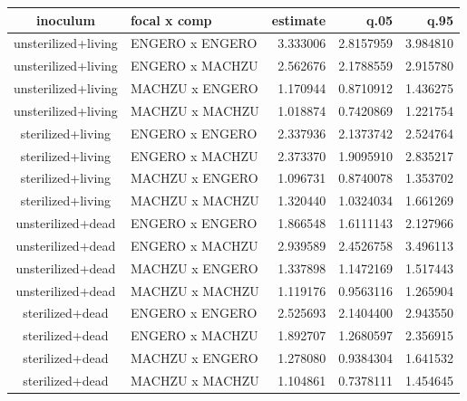 \begin{table}[t]
\fontsize{12.0pt}{14.4pt}\selectfont
\begin{tabular*}{\linewidth}{@{\extracolsep{\fill}}clrrr}
\toprule
inoculum & focal x comp & estimate & q.05 & q.95 \\ 
\midrule\addlinespace[2.5pt]
unsterilized+living & ENGERO x ENGERO & 3.333006 & 2.8157959 & 3.984810 \\ 
unsterilized+living & ENGERO x MACHZU & 2.562676 & 2.1788559 & 2.915780 \\ 
unsterilized+living & MACHZU x ENGERO & 1.170944 & 0.8710912 & 1.436275 \\ 
unsterilized+living & MACHZU x MACHZU & 1.018874 & 0.7420869 & 1.221754 \\ 
sterilized+living & ENGERO x ENGERO & 2.337936 & 2.1373742 & 2.524764 \\ 
sterilized+living & ENGERO x MACHZU & 2.373370 & 1.9095910 & 2.835217 \\ 
sterilized+living & MACHZU x ENGERO & 1.096731 & 0.8740078 & 1.353702 \\ 
sterilized+living & MACHZU x MACHZU & 1.320440 & 1.0324034 & 1.661269 \\ 
unsterilized+dead & ENGERO x ENGERO & 1.866548 & 1.6111143 & 2.127966 \\ 
unsterilized+dead & ENGERO x MACHZU & 2.939589 & 2.4526758 & 3.496113 \\ 
unsterilized+dead & MACHZU x ENGERO & 1.337898 & 1.1472169 & 1.517443 \\ 
unsterilized+dead & MACHZU x MACHZU & 1.119176 & 0.9563116 & 1.265904 \\ 
sterilized+dead & ENGERO x ENGERO & 2.525693 & 2.1404400 & 2.943550 \\ 
sterilized+dead & ENGERO x MACHZU & 1.892707 & 1.2680597 & 2.356915 \\ 
sterilized+dead & MACHZU x ENGERO & 1.278080 & 0.9384304 & 1.641532 \\ 
sterilized+dead & MACHZU x MACHZU & 1.104861 & 0.7378111 & 1.454645 \\ 
\bottomrule
\end{tabular*}
\end{table}

